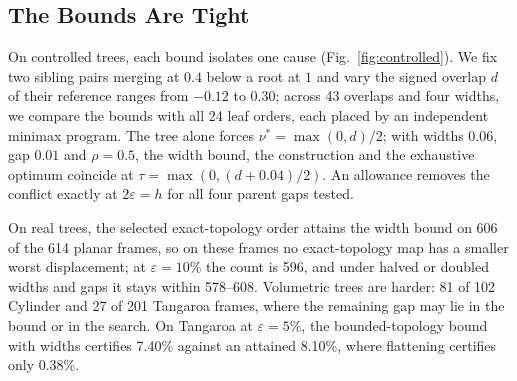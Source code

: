 \documentclass[review]{vgtc}
\begin{document}
\subsection{The Bounds Are Tight}
On controlled trees, each bound isolates one cause (Fig.~\ref{fig:controlled}). We fix two sibling pairs merging at $0.4$ below a root at $1$ and vary the signed overlap $d$ of their reference ranges from $-0.12$ to $0.30$; across 43 overlaps and four widths, we compare the bounds with all 24 leaf orders, each placed by an independent minimax program. The tree alone forces $\nu^*=\max(0,d)/2$; with widths $0.06$, gap $0.01$ and $\rho=0.5$, the width bound, the construction and the exhaustive optimum coincide at $\tau=\max(0,(d+0.04)/2)$. An allowance removes the conflict exactly at $2\varepsilon=h$ for all four parent gaps tested.

On real trees, the selected exact-topology order attains the width bound on 606 of the 614 planar frames, so on these frames no exact-topology map has a smaller worst displacement; at $\varepsilon=10\%$ the count is 596, and under halved or doubled widths and gaps it stays within 578--608. Volumetric trees are harder: 81 of 102 Cylinder and 27 of 201 Tangaroa frames, where the remaining gap may lie in the bound or in the search. On Tangaroa at $\varepsilon=5\%$, the bounded-topology bound with widths certifies 7.40\% against an attained 8.10\%, where flattening certifies only 0.38\%.
\end{document}
